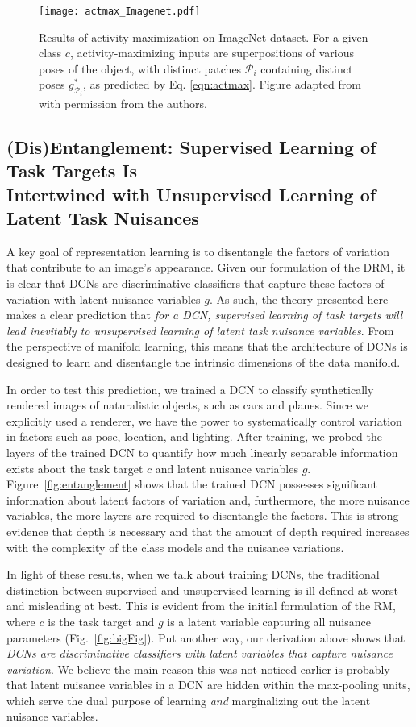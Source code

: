 \documentclass[12pt]{article}
\newcommand{\Pa}[0]{{ \mathcal{P} }}
\begin{document}
\begin{figure}
   \centering
   \texttt{[image: actmax\_Imagenet.pdf]} 
   \caption{Results of activity maximization on ImageNet dataset. 
   For a given class $c$, activity-maximizing inputs are superpositions of various poses of the object, with distinct patches $\Pa_{i}$ containing distinct poses $g^{*}_{\Pa_{i}}$, as predicted by Eq. \ref{eqn:actmax}. Figure adapted from \cite{simonyan2013deep} with permission from the authors.}
   \label{fig:actmax}
\end{figure}

\subsection{(Dis)Entanglement: Supervised Learning of Task Targets Is \\ Intertwined with Unsupervised Learning of Latent Task Nuisances}

A key goal of representation learning is to disentangle the factors of variation that contribute to an image's appearance. Given our formulation of the DRM, it is clear that DCNs are discriminative classifiers that capture these factors of variation with latent nuisance variables $g$. As such, the theory presented here makes a clear prediction that \emph{for a DCN, supervised learning of task targets will lead inevitably to unsupervised learning of latent task nuisance variables}. From the perspective of manifold learning, this means that the architecture of DCNs is designed to learn and disentangle the intrinsic dimensions of the data manifold.

In order to test this prediction, we trained a DCN to classify synthetically rendered images of naturalistic objects, such as cars and planes. Since we explicitly used a renderer, we have the power to systematically control variation in factors such as pose, location, and lighting. After training, we probed the layers of the trained DCN to quantify how much linearly separable information exists about the task target $c$ and latent nuisance variables $g$.  Figure~\ref{fig:entanglement} shows that the trained DCN possesses significant information about latent factors of variation and, furthermore, the more nuisance variables, the more layers are required to disentangle the factors. This is strong evidence that depth is necessary and that the amount of depth required increases with the complexity of the class models and the nuisance variations.

In light of these results, when we talk about training DCNs, the traditional distinction between supervised and unsupervised learning is ill-defined at worst and misleading at best.  This is evident from the initial formulation of the RM, where $c$ is the task target and $g$ is a latent variable capturing all nuisance parameters (Fig.~\ref{fig:bigFig}). Put another way, our derivation above shows that \emph{DCNs are discriminative classifiers with latent variables that capture nuisance variation}. We believe the main reason this was not noticed earlier is probably that latent nuisance variables in a DCN are hidden within the max-pooling units, which serve the dual purpose of learning \emph{and} marginalizing out the latent nuisance variables.
\end{document}
